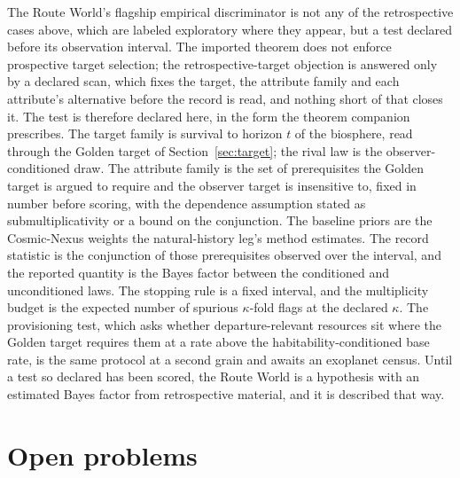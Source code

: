 The Route World's flagship empirical discriminator is not any of the
retrospective cases above, which are labeled exploratory where they
appear, but a test declared before its observation interval. The imported theorem does not enforce prospective target selection; the retrospective-target objection is answered only by a declared scan, which fixes the target, the attribute family and each attribute's alternative before the record is read, and nothing short of that closes it. The test is therefore declared here, in the form the
theorem companion prescribes. The target family is survival to horizon
$t$ of the biosphere, read through the Golden target of
Section~\ref{sec:target}; the rival law is the observer-conditioned
draw. The attribute family is the set of prerequisites the Golden target
is argued to require and the observer target is insensitive to, fixed in
number before scoring, with the dependence assumption stated as
submultiplicativity or a bound on the conjunction. The baseline priors are
the Cosmic-Nexus weights the natural-history leg's method estimates. The
record statistic is the conjunction of those prerequisites observed over
the interval, and the reported quantity is the Bayes factor between the
conditioned and unconditioned laws. The stopping rule is a fixed
interval, and the multiplicity budget is the expected number of spurious
$\kappa$-fold flags at the declared $\kappa$. The provisioning test, which
asks whether departure-relevant resources sit where the Golden target
requires them at a rate above the habitability-conditioned base rate,
is the same protocol at a second grain and awaits an exoplanet census.
Until a test so declared has been scored, the Route World is a hypothesis
with an estimated Bayes factor from retrospective material, and it is
described that way.

\section{Open problems}\label{sec:open}

